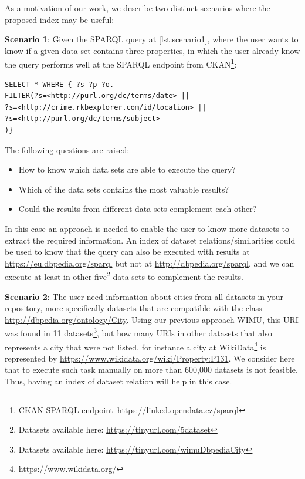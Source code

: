 As a motivation of our work, we describe two distinct scenarios where the proposed index may be useful:

\textbf{Scenario 1}: Given the SPARQL query at \cref{lst:scenario1}, where the user wants to know if a given data set contains three properties, in which the user already know the query performs well at the SPARQL endpoint from CKAN\footnote{  CKAN SPARQL endpoint~\url{https://linked.opendata.cz/sparql}}:

\begin{lstlisting}[language=SPARQL, label={lst:scenario1}, caption=Scenario 1.]
SELECT * WHERE { ?s ?p ?o.
FILTER(?s=<http://purl.org/dc/terms/date> || 
?s=<http://crime.rkbexplorer.com/id/location> || 
?s=<http://purl.org/dc/terms/subject>
)}
\end{lstlisting}
The following questions are raised:
\begin{itemize}
    \item How to know which data sets are able to execute the query?
    \item Which of the data sets contains the most valuable results?
    \item Could the results from different data sets complement each other?
\end{itemize}

In this case an approach is needed to enable the user to know more datasets to extract the required information. An index of dataset relations/similarities could be used to know that the query can also be executed with results at \url{https://eu.dbpedia.org/sparql} but not at \url{http://dbpedia.org/sparql}, and we can execute at least in other five\footnote{Datasets available here: \url{https://tinyurl.com/5dataset}} data sets to complement the results.

\textbf{Scenario 2}: The user need information about cities from all datasets in your repository, more specifically datasets that are compatible with the class \url{http://dbpedia.org/ontology/City}. Using our previous approach WIMU\cite{valdestilhas2018my}, this URI was found in 11 datasets\footnote{Datasets available here: \url{https://tinyurl.com/wimuDbpediaCity}}, but how many URIs in other datasets that also represents a city that were not listed, for instance a city at WikiData\footnote{\url{https://www.wikidata.org/}} is represented by  \url{https://www.wikidata.org/wiki/Property:P131}.
We consider here that to execute such task manually on more than 600,000 datasets is not feasible. Thus, having an index of dataset relation will help in this case.

